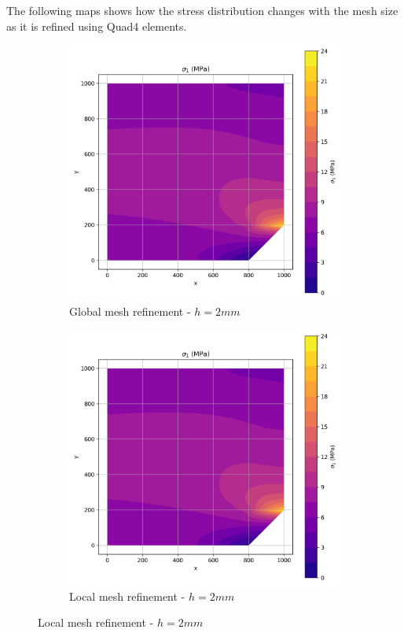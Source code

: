 The following maps shows how the stress distribution changes with the mesh size as it is refined using Quad4 elements.

\begin{figure}[H]
  \centering
  \begin{subfigure}[b]{0.45\textwidth}
    \centering
    \includegraphics[width=\textwidth]{GRAFICOS/Quad4/2mm_global/resultados - sigma_1.png}
    \caption{Global mesh refinement - $h=2mm$}
    \label{fig:img1}
  \end{subfigure}
  \hfill
  \begin{subfigure}[b]{0.45\textwidth}
    \centering
    \includegraphics[width=\textwidth]{GRAFICOS/Quad4/2mm_global/resultados - sigma_1.png}
    \caption{Local mesh refinement - $h=2mm$}
    \label{fig:img2}
  \end{subfigure}
\end{figure}

